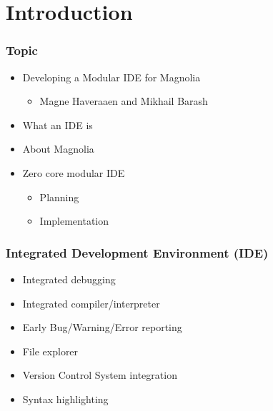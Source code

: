 \section{Introduction}
\SectionPage

\begin{frame}
  \frametitle{Topic}
  \begin{itemize}
    \item Developing a Modular IDE for Magnolia
      \pause
      \begin{itemize}
        \item Magne Haveraaen and Mikhail Barash
      \end{itemize}
      \pause
    \item What an IDE is
    \item About Magnolia
    \item Zero core modular IDE
      \begin{itemize}
        \item Planning
        \item Implementation
      \end{itemize}
  \end{itemize}
\end{frame}

\begin{frame}
  \frametitle{Integrated Development Environment (IDE)}
  \begin{itemize}
      \pause
    \item Integrated debugging
      \pause
    \item Integrated compiler/interpreter
      \pause
    \item Early Bug/Warning/Error reporting
      \pause
    \item File explorer
      \pause
    \item Version Control System integration
      \pause
    \item Syntax highlighting
  \end{itemize}
\end{frame}

